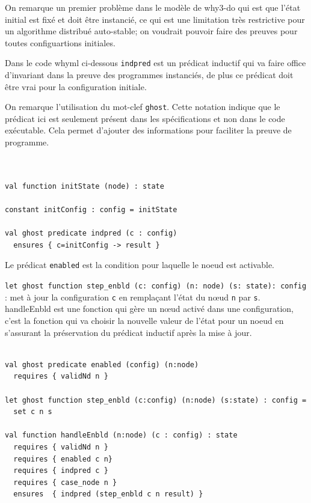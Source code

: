 \documentclass[11pt]{article}
\begin{document}
On remarque un premier problème dans le modèle de why3-do qui est que l'état initial est fixé et 
doit être instancié, ce qui est une limitation très restrictive pour un algorithme distribué auto-stable;
on voudrait pouvoir faire des preuves pour toutes configuartions initiales.

Dans le code whyml ci-dessous \texttt{indpred} est un prédicat inductif qui va faire office d'invariant dans la preuve des programmes instanciés, 
de plus ce prédicat doit être vrai pour la configuration initiale. 

On remarque l'utilisation du mot-clef \texttt{ghost}. Cette notation indique que le prédicat ici est seulement présent dans 
les spécifications et non dans le code exécutable. Cela permet d'ajouter des informations pour faciliter la
preuve de programme.
\lstset{language=why3,label= ,caption= ,captionpos=b,numbers=none}
\begin{lstlisting}


val function initState (node) : state

constant initConfig : config = initState

val ghost predicate indpred (c : config)
  ensures { c=initConfig -> result }

\end{lstlisting}
Le prédicat \texttt{enabled} est la condition pour laquelle le noeud est activable.

\texttt{let ghost function step\_enbld (c: config) (n: node) (s: state): config} : met à jour la configuration \texttt{c} en remplaçant l'état du nœud \texttt{n} par \texttt{s}.
handleEnbld est une fonction qui gère un nœud activé dans une configuration, c'est la fonction qui va choisir la nouvelle valeur de l'état pour un noeud
en s'assurant la préservation du prédicat inductif après la mise à jour. 
\lstset{language=why3,label= ,caption= ,captionpos=b,numbers=none}
\begin{lstlisting}

val ghost predicate enabled (config) (n:node)
  requires { validNd n }

let ghost function step_enbld (c:config) (n:node) (s:state) : config =
  set c n s

val function handleEnbld (n:node) (c : config) : state
  requires { validNd n }
  requires { enabled c n}
  requires { indpred c }
  requires { case_node n }
  ensures  { indpred (step_enbld c n result) }

\end{lstlisting}
\end{document}
